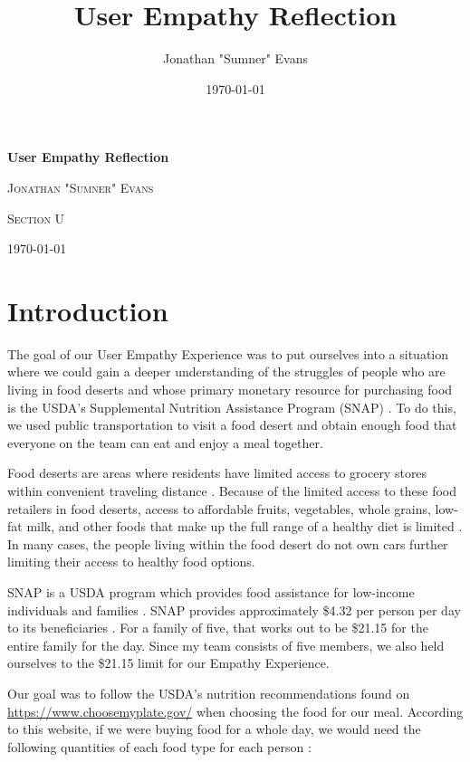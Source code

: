 \documentclass[11pt]{article}
\title{User Empathy Reflection}
\author{Jonathan "Sumner" Evans}
\date{\today}
\begin{document}
\begin{titlepage}
    \centering
    \vspace{5cm}
    {\huge\bfseries User Empathy Reflection \par}
    \vspace{1cm}
    {\scshape\Large Jonathan "Sumner" Evans\par}
    \vfill
    {\scshape\large Section U\par}
    {\large \today\par}
    \vfill
\end{titlepage}

\section{Introduction}
The goal of our User Empathy Experience was to put ourselves into a situation where we could gain a
deeper understanding of the struggles of people who are living in food deserts and whose primary
monetary resource for purchasing food is the USDA's Supplemental Nutrition Assistance Program
(SNAP) \cite{usda-snap}. To do this, we used public transportation to visit a food desert and obtain
enough food that everyone on the team can eat and enjoy a meal together.

Food deserts are areas where residents have limited access to grocery stores within convenient
traveling distance \cite{fep}. Because of the limited access to these food retailers in food
deserts, access to affordable fruits, vegetables, whole grains, low-fat milk, and other foods that
make up the full range of a healthy diet is limited \cite{cdc}. In many cases, the people living
within the food desert do not own cars \cite{usda-access} further limiting their access to healthy
food options.

SNAP is a USDA program which provides food assistance for low-income individuals and families
\cite{usda-snap}. SNAP provides approximately \$4.32 per person per day to its beneficiaries
\cite{cbpp}. For a family of five, that works out to be \$21.15 for the entire family for the day.
Since my team consists of five members, we also held ourselves to the \$21.15 limit for our Empathy
Experience.

Our goal was to follow the USDA's nutrition recommendations found on
\url{https://www.choosemyplate.gov/} when choosing the food for our meal. According to this website,
if we were buying food for a whole day, we would need the following quantities of each food type for
each person \cite{myplate}:
\end{document}
